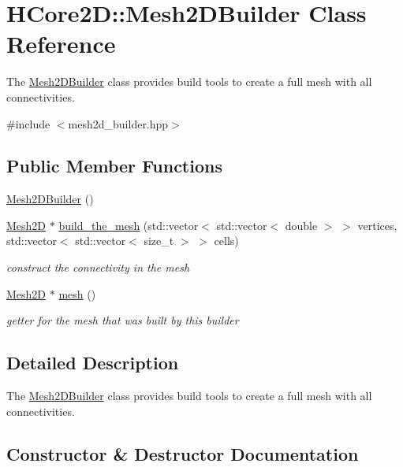 \hypertarget{classHCore2D_1_1Mesh2DBuilder}{}\section{H\+Core2D\+:\+:Mesh2\+D\+Builder Class Reference}
\label{classHCore2D_1_1Mesh2DBuilder}


The \hyperlink{classHCore2D_1_1Mesh2DBuilder}{Mesh2\+D\+Builder} class provides build tools to create a full mesh with all connectivities.  




{\ttfamily \#include $<$mesh2d\+\_\+builder.\+hpp$>$}

\subsection*{Public Member Functions}
\begin{DoxyCompactItemize}
\item 
\hyperlink{classHCore2D_1_1Mesh2DBuilder_aace3b9d1ce3b4e0b53590b75f734dd96}{Mesh2\+D\+Builder} ()
\item 
\hyperlink{classHCore2D_1_1Mesh2D}{Mesh2D} $\ast$ \hyperlink{classHCore2D_1_1Mesh2DBuilder_a66379a977bf320cc456c4693b78707c8}{build\+\_\+the\+\_\+mesh} (std\+::vector$<$ std\+::vector$<$ double $>$ $>$ vertices, std\+::vector$<$ std\+::vector$<$ size\+\_\+t $>$ $>$ cells)
\begin{DoxyCompactList}\small\item\em construct the connectivity in the mesh \end{DoxyCompactList}\item 
\hyperlink{classHCore2D_1_1Mesh2D}{Mesh2D} $\ast$ \hyperlink{group__Mesh2D_ga870645a89a2875483ca2c309c302524a}{mesh} ()
\begin{DoxyCompactList}\small\item\em getter for the mesh that was built by this builder \end{DoxyCompactList}\end{DoxyCompactItemize}


\subsection{Detailed Description}
The \hyperlink{classHCore2D_1_1Mesh2DBuilder}{Mesh2\+D\+Builder} class provides build tools to create a full mesh with all connectivities. 

\subsection{Constructor \& Destructor Documentation}
\mbox{\label{classHCore2D_1_1Mesh2DBuilder_aace3b9d1ce3b4e0b53590b75f734dd96}} 
